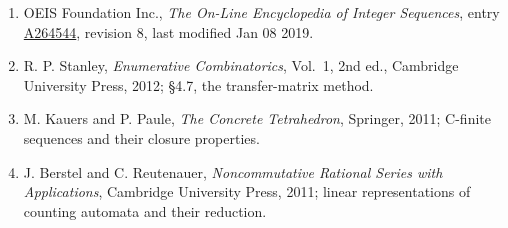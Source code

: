 \documentclass[11pt]{article}
\theoremstyle{definition}
\begin{document}
\begin{enumerate}

\item OEIS Foundation Inc., \emph{The On-Line Encyclopedia of Integer Sequences}, entry \href{https://oeis.org/A264544}{A264544}, revision 8, last modified Jan 08 2019.

\item R. P. Stanley, \emph{Enumerative Combinatorics}, Vol.~1, 2nd ed., Cambridge University Press, 2012; \S4.7, the transfer-matrix method.

\item M. Kauers and P. Paule, \emph{The Concrete Tetrahedron}, Springer, 2011; C-finite sequences and their closure properties.

\item J. Berstel and C. Reutenauer, \emph{Noncommutative Rational Series with Applications}, Cambridge University Press, 2011; linear representations of counting automata and their reduction.

\end{enumerate}
\end{document}
